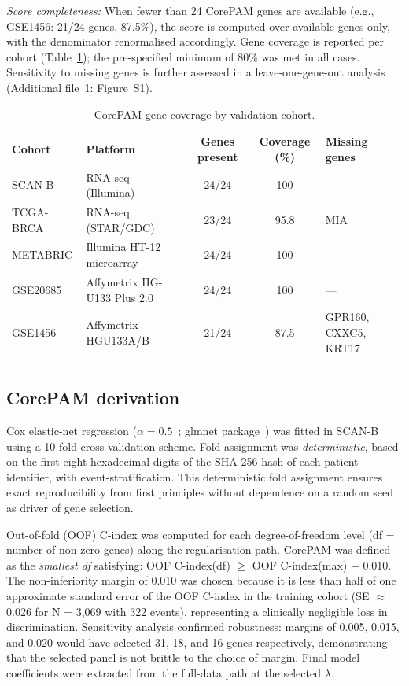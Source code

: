 \documentclass[referee,lineno,pdflatex,sn-vancouver-num]{sn-jnl}
\begin{document}
\textit{Score completeness:} When fewer than 24 CorePAM genes are available (e.g., GSE1456: 21/24 genes, 87.5\%), the score is computed over available genes only, with the denominator renormalised accordingly. Gene coverage is reported per cohort (Table~\ref{tab:coverage}); the pre-specified minimum of 80\% was met in all cases. Sensitivity to missing genes is further assessed in a leave-one-gene-out analysis (Additional file~1: Figure~S1).

\begin{table}[h]
\caption{CorePAM gene coverage by validation cohort.}\label{tab:coverage}
\begin{tabular}{@{}llccl@{}}
\toprule
Cohort & Platform & Genes present & Coverage (\%) & Missing genes \\
\midrule
SCAN-B & RNA-seq (Illumina) & 24/24 & 100 & --- \\
TCGA-BRCA & RNA-seq (STAR/GDC) & 23/24 & 95.8 & MIA \\
METABRIC & Illumina HT-12 microarray & 24/24 & 100 & --- \\
GSE20685 & Affymetrix HG-U133 Plus 2.0 & 24/24 & 100 & --- \\
GSE1456 & Affymetrix HGU133A/B & 21/24 & 87.5 & GPR160, CXXC5, KRT17 \\
\botrule
\end{tabular}
\end{table}

\subsection{CorePAM derivation}\label{subsec:corepam-derivation}

Cox elastic-net regression ($\alpha = 0.5$~\cite{zou2005,tibshirani1997}; glmnet package~\cite{friedman2010,simon2011}) was fitted in SCAN-B using a 10-fold cross-validation scheme. Fold assignment was \textit{deterministic}, based on the first eight hexadecimal digits of the SHA-256 hash of each patient identifier, with event-stratification. This deterministic fold assignment ensures exact reproducibility from first principles without dependence on a random seed as driver of gene selection.

Out-of-fold (OOF) C-index was computed for each degree-of-freedom level (df = number of non-zero genes) along the regularisation path. CorePAM was defined as the \textit{smallest df} satisfying: OOF C-index(df) $\geq$ OOF C-index(max) $-$ 0.010. The non-inferiority margin of 0.010 was chosen because it is less than half of one approximate standard error of the OOF C-index in the training cohort (SE $\approx$ 0.026 for N = 3,069 with 322 events), representing a clinically negligible loss in discrimination. Sensitivity analysis confirmed robustness: margins of 0.005, 0.015, and 0.020 would have selected 31, 18, and 16 genes respectively, demonstrating that the selected panel is not brittle to the choice of margin. Final model coefficients were extracted from the full-data path at the selected $\lambda$.
\end{document}
